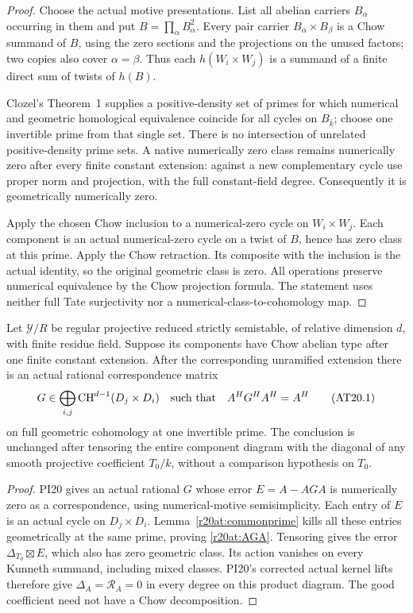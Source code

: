 \begin{proof}
Choose the actual motive presentations.  List all abelian carriers
$B_\alpha$ occurring in them and put
$B=\prod_\alpha B_\alpha^2$.  Every pair carrier
$B_\alpha\times B_\beta$ is a Chow summand of $B$, using the
zero sections and the projections on the unused factors; two copies
also cover $\alpha=\beta$.  Thus each $h(W_i\times W_j)$ is
a summand of a finite direct sum of twists of $h(B)$.

Clozel's Theorem~1 supplies a positive-density set of primes for
which numerical and geometric homological equivalence coincide
for all cycles on $B_{\bar k}$; choose one invertible prime from
that single set.  There is no intersection of unrelated
positive-density prime sets.  A native numerically zero class
remains numerically zero after every finite constant extension:
against a new complementary cycle use proper norm and projection,
with the full constant-field degree.  Consequently it is
geometrically numerically zero.

Apply the chosen Chow inclusion to a numerical-zero cycle on
$W_i\times W_j$.  Each component is an actual numerical-zero
cycle on a twist of $B$, hence has zero class at this prime.
Apply the Chow retraction.  Its composite with the inclusion is
the actual identity, so the original geometric class is zero.
All operations preserve numerical equivalence by the Chow
projection formula.  The statement uses neither full Tate
surjectivity nor a numerical-class-to-cohomology map.
\end{proof}

\begin{proposition}
\label{r20at:inverse}
Let $\mathcal Y/R$ be regular projective reduced strictly
semistable, of relative dimension $d$, with finite residue field.
Suppose its components have Chow abelian type after one finite
constant extension.  After the corresponding unramified extension
there is an actual rational correspondence matrix
\[
 G\in\bigoplus_{i,j}\operatorname{CH}^{d-1}(D_j\times D_i)
 \quad\hbox{such that}\quad A^H G^H A^H=A^H
 \tag{AT20.1}\label{r20at:AGA}
\]
on full geometric cohomology at one invertible prime.
The conclusion is unchanged after tensoring the entire component
diagram with the diagonal of any smooth projective coefficient
$T_0/k$, without a comparison hypothesis on $T_0$.
\end{proposition}

\begin{proof}
PI20 gives an actual rational $G$ whose error $E=A-AGA$ is
numerically zero as a correspondence, using numerical-motive
semisimplicity.  Each entry of $E$ is an actual cycle on
$D_j\times D_i$.  Lemma~\ref{r20at:commonprime} kills all these
entries geometrically at the same prime, proving
\eqref{r20at:AGA}.  Tensoring gives the error
$\Delta_{T_0}\boxtimes E$, which also has zero geometric class.
Its action vanishes on every Kunneth summand, including mixed
classes.  PI20's corrected actual kernel lifts therefore give
$\Delta_A=\mathscr R_A=0$ in every degree on this product
diagram.  The good coefficient need not have a Chow decomposition.
\end{proof}

